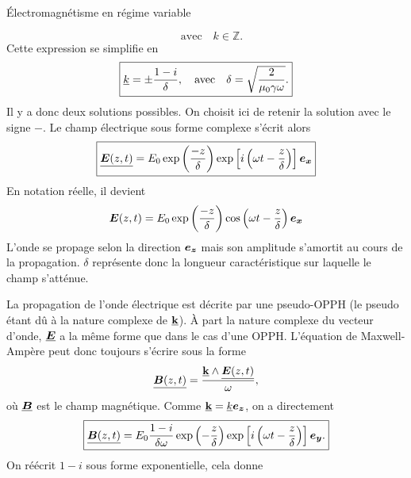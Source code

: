 \begin{corr}{Électromagnétisme en régime variable}
\begin{corrlist}
\begin{equation*}
		      \quad \mathrm{avec} \quad k \in \mathbb{Z}.
	     \end{equation*}
	     Cette expression se simplifie en 
	     \begin{equation*}
		     \boxed{
		     \underline{k} = \pm \dfrac{1 - i}{\delta},
		     \quad \mathrm{avec} \quad \delta = \sqrt{\dfrac{2}{\mu_0 \gamma
		     \omega}}
	     .}
     	     \end{equation*}
	     Il y a donc deux solutions possibles. On choisit ici de retenir la
	     solution avec le signe $-$. Le champ électrique sous forme complexe
	     s'écrit alors
	     \begin{equation*}
		     \boxed{
			     \complex{\vece(z, t)} = E_0 \exp\left(\dfrac{-z}{\delta}
				     \right)\exp\left[i\left(\omega t - 
				     \dfrac{z}{\delta}\right)\right]\ex
		     }
	     \end{equation*}
	     En notation réelle, il devient
	     \begin{equation*}
		     \vece(z, t) = E_0 \exp\left(\dfrac{-z}{\delta}
				     \right)\cos\left(\omega t - 
				     \dfrac{z}{\delta}\right)\ex
	     \end{equation*}
	     L'onde se propage selon la direction $\ez$ mais son amplitude s'amortit
	     au cours de la propagation. $\delta$ représente donc la longueur
	     caractéristique sur laquelle le champ s'atténue.
     	\item La propagation de l'onde électrique est décrite par une 
	      pseudo-OPPH (le pseudo étant dû à la nature complexe
	      de $\underline{\mathbf{k}}$). À part la nature complexe du vecteur
	      d'onde, $\complex{\vece}$ a la même forme que dans le cas d'une
	      OPPH. L'équation de Maxwell-Ampère peut donc toujours s'écrire 
	      sous la forme
	      \begin{equation*}
		      \complex{\vecb(z, t)} = \dfrac{\complex{\vec{k}} \wedge 
		      \complex{\vece(z, t)}}{\omega},
	      \end{equation*}
	      où $\complex{\vecb}$ est le champ magnétique.
      Comme $\complex{\vec{k}} = \complex{k} \ez$, on a directement
	      \begin{equation*}
		      \boxed{
			      \complex{\vecb(z, t)} = E_0 \dfrac{1 - i}{\delta \omega}
		      \exp\left(- \dfrac{z}{\delta}\right)
		      \exp\left[i\left(\omega t - \dfrac{z}{\delta}\right)\right] \ey.
	      }
      	      \end{equation*}
	      On réécrit $1 - i$ sous forme exponentielle, cela donne
	      \begin{equation*}

\end{equation*}
\end{corrlist}
\end{corr}
